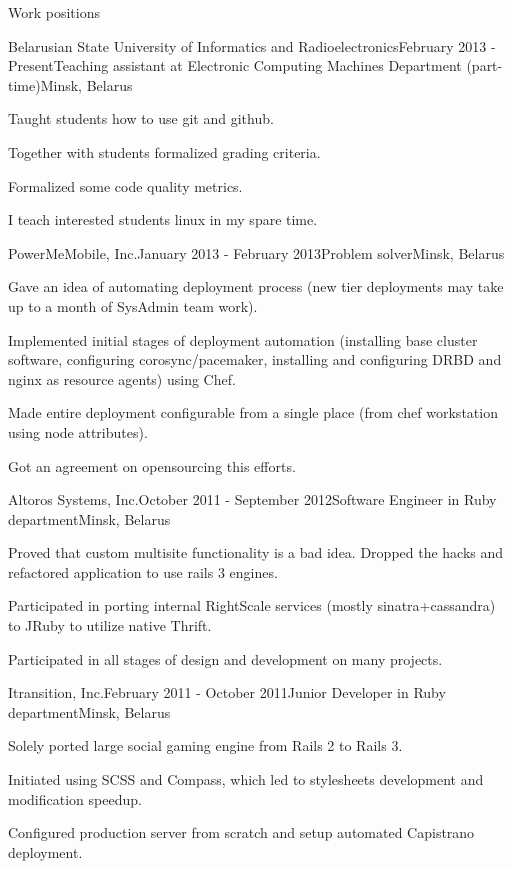 \documentclass{resume} %
\begin{document}
\begin{rSection}{Work positions}

\begin{rSubsection}{Belarusian State University of Informatics and Radioelectronics}{February 2013 - Present}{Teaching assistant at Electronic Computing Machines Department (part-time)}{Minsk, Belarus}
\item Taught students how to use git and github.
\item Together with students formalized grading criteria.
\item Formalized some code quality metrics.
\item I teach interested students linux in my spare time.
\end{rSubsection}

\begin{rSubsection}{PowerMeMobile, Inc.}{January 2013 - February 2013}{Problem solver}{Minsk, Belarus}
\item Gave an idea of automating deployment process (new tier deployments may take up to
  a month of SysAdmin team work).
\item Implemented initial stages of deployment automation (installing base cluster software,
  configuring corosync/pacemaker, installing and configuring DRBD and nginx as resource agents) using Chef.
\item Made entire deployment configurable from a single place (from chef workstation using node attributes).
\item Got an agreement on opensourcing this efforts.
\end{rSubsection}

\begin{rSubsection}{Altoros Systems, Inc.}{October 2011 - September 2012}{Software Engineer in Ruby department}{Minsk, Belarus}
\item Proved that custom multisite functionality is a bad idea. Dropped the hacks and refactored application to use rails 3 engines.
\item Participated in porting internal RightScale services (mostly sinatra+cassandra) to JRuby to utilize native Thrift.
\item Participated in all stages of design and development on many projects.
\end{rSubsection}

\begin{rSubsection}{Itransition, Inc.}{February 2011 - October 2011}{Junior Developer in Ruby department}{Minsk, Belarus}
\item Solely ported large social gaming engine from Rails 2 to Rails 3.
\item Initiated using SCSS and Compass, which led to stylesheets development and modification speedup.
\item Configured production server from scratch and setup automated Capistrano deployment.
\end{rSubsection}

\end{rSection}
\end{document}
